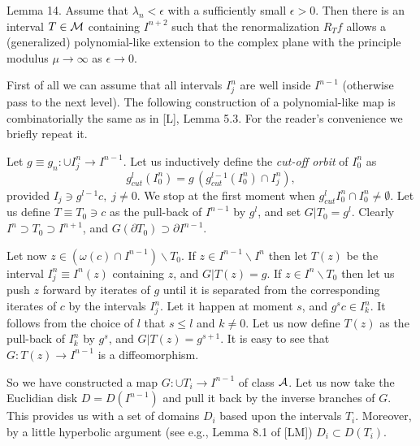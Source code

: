 \proclaim Lemma 14.
Assume that $\lambda_n<\epsilon$ with a sufficiently small $\epsilon>0$. 
Then there is an interval $T\in {\cal M}$ containing $I^{n+2}$ 
such that the renormalization $R_T f$
allows a (generalized) polynomial-like extension
to the complex plane with the
principle modulus $\mu\to\infty$ as $\epsilon\to 0$.

 First of all we can assume that all intervals $I^n_j$
are well inside $I^{n-1}$ (otherwise pass to the next level). 
The following  construction of a polynomial-like map
is combinatorially the same  
as in [L], Lemma 5.3. For the reader's convenience we briefly repeat it.

Let $g\equiv g_n: \cup I^n_j\rightarrow I^{n-1}$.  Let us inductively define
the {\sl cut-off orbit} of $I^n_0$ as
$$g^l_{cut} (I^n_0)= g\,(g^{l-1}_{cut}(I^n_0)\cap I^n_j),$$
provided $I_j\ni g^{l-1}c, \; j\not=0$. We stop at the first  moment when
$g^l_{cut} I^n_0\cap I^n_0\not=\emptyset$. Let us define  
$T\equiv T_0\ni c$  as the 
pull-back of $I^{n-1}$ by $g^l$, and set $G|T_0=g^l$. Clearly
$I^n\supset T_0\supset I^{n+1}$, and  $G(\partial T_0)\supset\partial I^{n-1}.$

Let now $z\in (\omega(c)\cap I^{n-1})\backslash T_0$.  
If $z\in I^{n-1}\backslash I^n$ then let $T(z)$ be the interval 
$I^n_j\equiv I^n(z)$ containing $z$, and $G|T(z)=g$.
If $z\in I^n\backslash T_0$ then let us push $z$ forward by iterates of $g$
until it is separated from the corresponding iterates of $c$ by the intervals
$I^n_j$. Let it happen at moment $s$, and $g^s c\in I^n_k$. It follows from
the choice of $l$ that $s\leq l$ and $k\not=0$. Let us now define
$T(z)$ as the pull-back of $I^n_k$ by $g^s$, and $G|T(z)=g^{s+1}$.
It is easy to see that $G: T(z)\rightarrow I^{n-1}$ is a diffeomorphism.

So we have constructed a map $G: \cup T_i\rightarrow I^{n-1}$ 
of class ${\cal A}$.
Let us now take the Euclidian disk $D=D(I^{n-1})$ and pull it back by
the inverse branches of $G$. This provides us with a set of domains $D_i$
based upon the intervals $T_i$. Moreover, by a little hyperbolic
argument (see e.g., Lemma 8.1 of [LM]) $D_i\subset D(T_i)$.

